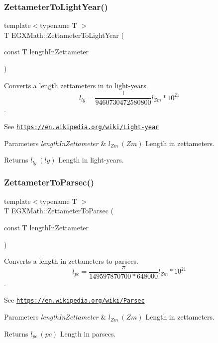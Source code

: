 \subsubsection{\texorpdfstring{Zettameter\+To\+Light\+Year()}{ZettameterToLightYear()}}
{\footnotesize\ttfamily template$<$typename T $>$ \\
T E\+G\+X\+Math\+::\+Zettameter\+To\+Light\+Year (\begin{DoxyParamCaption}\item[{const T}]{length\+In\+Zettameter }\end{DoxyParamCaption})}



Converts a length zettameters in to light-\/years. \[ l_{ly}= \frac{1}{9460730472580800} l_{Zm} * 10^{21} \]. 

See \href{https://en.wikipedia.org/wiki/Light-year}{\tt https\+://en.\+wikipedia.\+org/wiki/\+Light-\/year} 
\begin{DoxyParams}{Parameters}
{\em length\+In\+Zettameter} & $ l_{Zm}\ (Zm)$ Length in zettameters. \\
\hline
\end{DoxyParams}
\begin{DoxyReturn}{Returns}
$ l_{ly}\ (ly)$ Length in light-\/years. 
\end{DoxyReturn}
\mbox{\label{group___e_g_x_math-_conversions-_length_conversions-_s_i-_zettameter-_astronomical_ga7924b0bc32c99624e84dcfb09806f730}} 
\subsubsection{\texorpdfstring{Zettameter\+To\+Parsec()}{ZettameterToParsec()}}
{\footnotesize\ttfamily template$<$typename T $>$ \\
T E\+G\+X\+Math\+::\+Zettameter\+To\+Parsec (\begin{DoxyParamCaption}\item[{const T}]{length\+In\+Zettameter }\end{DoxyParamCaption})}



Converts a length in zettameters to parsecs. \[ l_{pc}=\frac{\pi}{149597870700 * 648000} l_{Zm} * 10^{21} \]. 

See \href{https://en.wikipedia.org/wiki/Parsec}{\tt https\+://en.\+wikipedia.\+org/wiki/\+Parsec} 
\begin{DoxyParams}{Parameters}
{\em length\+In\+Zettameter} & $ l_{Zm}\ (Zm)$ Length in zettameters. \\
\hline
\end{DoxyParams}
\begin{DoxyReturn}{Returns}
$ l_{pc}\ (pc)$ Length in parsecs. 
\end{DoxyReturn}
